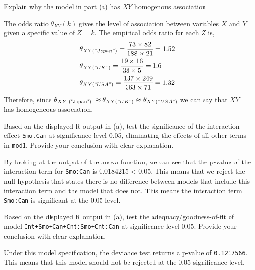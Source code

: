 \documentclass[nocolor]{report}
\begin{document}
\begin{ex}[Question 2b] 
    Explain why
the model in part (a) has $XY$ homogenous association
\end{ex}
\vspace{-10pt}
\begin{soln}
    The odds ratio $\theta_{X Y}(k)$ gives the level of association between variables $X$ and $Y$ given a specific value of $Z=k$. The empirical odds ratio for each $Z$ is,
    \begin{align*}
        & \theta_{X Y(" J a p a n ")}=\frac{73 \times 82}{188 \times 21}=1.52 \\
        & \theta_{X Y(" U K ")}=\frac{19 \times 16}{38 \times 5}=1.6 \\
        & \theta_{X Y(" U S A ")}=\frac{137 \times 249}{363 \times 71}=1.32
    \end{align*}
Therefore, since $\theta_{X Y \text { ("Japan") }} \approx \theta_{X Y(" U K ")} \approx \theta_{X Y(" U S A ")}$ we can say that $X Y$ has homogeneous association.
\end{soln}

\begin{ex}[Question 2c] 
    Based on the displayed R output in (a), test the significance of the interaction effect \texttt{Smo:Can} at significance level 0.05, eliminating the effects of all other terms in \texttt{mod1}. Provide your conclusion with clear explanation.
\end{ex}
\vspace{-10pt}
\begin{soln}
    By looking at the output of the anova function, we can see that the p-value of the interaction term for \texttt{Smo:Can} is 0.0184215 < 0.05. This means that we reject the null hypothesis that states there is
no difference between models that include this interaction term and the model that does not. This means the interaction term \texttt{Smo:Can} is significant at the 0.05 level.
\end{soln}


\begin{ex}[Question 2d] 
    Based on the displayed R output in (a), test the adequacy/goodness-of-fit of model
    \texttt{Cnt+Smo+Can+Cnt:Smo+Cnt:Can}
at significance level 0.05. Provide your conclusion with clear explanation.
\end{ex}
\vspace{-10pt}
\begin{soln}
    Under this model specification, the deviance test returns a p-value of \texttt{0.1217566}. This means that
this model should not be rejected at the 0.05 significance level.
\end{soln}
\end{document}
